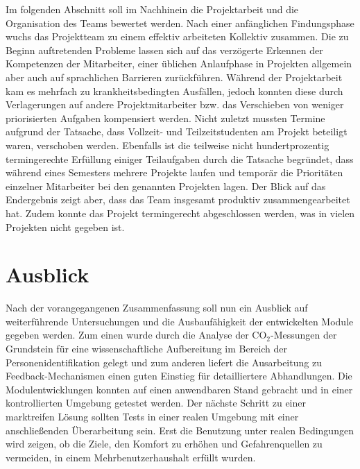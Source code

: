 \documentclass[12pt, oneside, smallheadings]{scrbook}
\begin{document}
\noindent
Im folgenden Abschnitt soll im Nachhinein die Projektarbeit und die Organisation des Teams bewertet werden. Nach einer anfänglichen Findungsphase wuchs das Projektteam zu einem effektiv arbeiteten Kollektiv zusammen. Die zu Beginn auftretenden Probleme lassen sich auf das verzögerte Erkennen der Kompetenzen der Mitarbeiter, einer üblichen Anlaufphase in Projekten allgemein aber auch auf sprachlichen Barrieren zurückführen. Während der Projektarbeit kam es mehrfach zu krankheitsbedingten Ausfällen, jedoch konnten diese durch Verlagerungen auf andere Projektmitarbeiter bzw. das Verschieben von weniger priorisierten Aufgaben kompensiert werden. Nicht zuletzt mussten Termine aufgrund der Tatsache, dass Vollzeit- und Teilzeitstudenten am Projekt beteiligt waren, verschoben werden. Ebenfalls ist die teilweise nicht hundertprozentig termingerechte Erfüllung einiger Teilaufgaben durch die Tatsache begründet, dass während eines Semesters mehrere Projekte laufen und temporär die Prioritäten einzelner Mitarbeiter bei den genannten Projekten lagen. Der Blick auf das Endergebnis zeigt aber, dass das Team insgesamt produktiv zusammengearbeitet hat. Zudem konnte das Projekt termingerecht abgeschlossen werden, was in vielen Projekten nicht gegeben ist.



\section{Ausblick}

Nach der vorangegangenen Zusammenfassung soll nun ein Ausblick auf weiterführende Untersuchungen und die Ausbaufähigkeit der entwickelten Module gegeben werden. Zum einen wurde durch die Analyse der CO$_2$-Messungen der Grundstein für eine wissenschaftliche Aufbereitung im Bereich der Personenidentifikation gelegt und zum anderen liefert die Ausarbeitung zu Feedback-Mechanismen einen guten Einstieg für detailliertere Abhandlungen.
Die Modulentwicklungen konnten auf einen anwendbaren Stand gebracht und in einer kontrollierten Umgebung getestet werden. Der nächste Schritt zu einer marktreifen Lösung sollten Tests in einer realen Umgebung mit einer anschließenden Überarbeitung sein. Erst die Benutzung unter realen Bedingungen wird zeigen, ob die Ziele, den Komfort zu erhöhen und Gefahrenquellen zu vermeiden, in einem Mehrbenutzerhaushalt erfüllt wurden.
\end{document}
